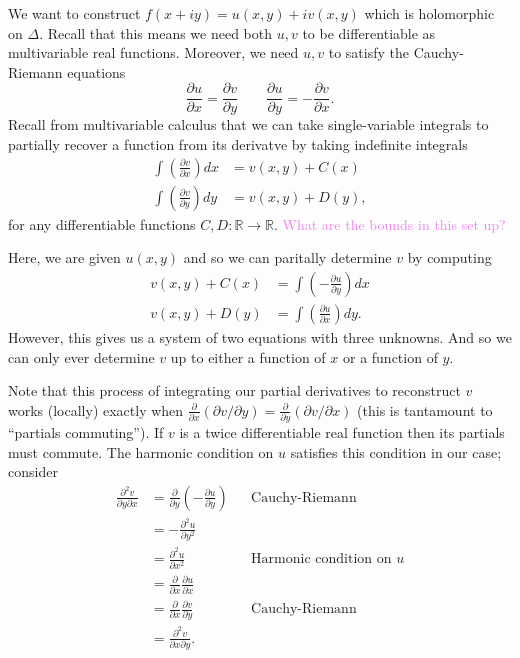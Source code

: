 \documentclass[12pt,letterpaper,boxed]{hmcpset}
\newcommand{\wg}[1]{\textcolor{violet}{#1}}
\newcommand{\R}{\mathbb R}
\newcommand{\pdv}[2]{\frac{\partial #1}{\partial #2}}
\begin{document}
\begin{solution}
We want to construct $f(x+iy) = u(x,y) + iv(x,y)$ which is holomorphic
on $\Delta$. Recall that this means we need both $u,v$ to be
differentiable as multivariable real functions. Moreover, we need
$u,v$ to satisfy the Cauchy-Riemann equations \[
	\frac{\partial u}{\partial x} = \frac{\partial v}{\partial y} 
	\qquad \frac{\partial u}{\partial y} = - \frac{\partial v}{\partial x}.
\]
Recall from multivariable calculus that we can take single-variable
integrals to partially recover a function from its derivatve by taking
indefinite integrals
\begin{align*}
	\int \left( \pdv{v}{x} \right) dx &= v(x,y) + C(x) \\
	\int \left( \pdv{v}{y} \right) dy &= v(x,y) + D(y),
\end{align*}
for any differentiable functions $C,D : \R \to \R$. \wg{What are the bounds in this
set up?}

Here, we are given $u(x,y)$ and so we can paritally determine $v$ by
computing 
\begin{align*}
	v(x,y) + C(x) &= \int \left( -\pdv{u}{y} \right) dx \\
	v(x,y) + D(y) &= \int \left( \pdv{u}{x} \right) dy.
\end{align*}
However, this gives us a system of two equations with three unknowns. 
And so we can only ever determine $v$ up to either a function of $x$
or a function of $y$. 

Note that this process of integrating our partial derivatives to
reconstruct $v$ works (locally) exactly when 
$\pdv{}{x}(\partial v / \partial y)
= \pdv{}{y}(\partial v / \partial x)$ (this is tantamount to
``partials commuting''). If $v$ is a
twice differentiable real function then its partials must commute.
The harmonic condition on $u$ satisfies this condition in our case;
consider 
\begin{align*}
	\frac{\partial^2 v}{\partial y \partial x}
	&= \pdv{}{y} \left(-\pdv{u}{y} \right) && \text{Cauchy-Riemann} \\
	&= -\frac{\partial^2 u}{\partial y^2} \\
	&= \frac{\partial^2 u}{\partial x^2}  && \text{Harmonic condition on $u$} \\
	&= \pdv{}{x} \pdv{u}{x} \\
	&= \pdv{}{x} \pdv{v}{y} && \text{Cauchy-Riemann} \\
	&= \frac{\partial ^2 v}{\partial x \partial y}. \\
\end{align*}

\end{solution}

\newpage
\end{document}
